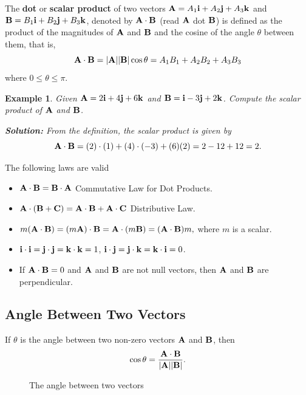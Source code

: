 \documentclass[titlepage,a4paper,12pt]{report}
\newtheorem{example}{Example}[section]
\begin{document}
\noindent The \textbf{dot} or \textbf{scalar product} of two vectors ${\bf{A}}=A_1{\bf{i}}+A_2{\bf{j}}+A_3{\bf{k}}$ and ${\bf{B}}=B_1{\bf{i}}+B_2{\bf{j}}+{B_3\bf{k}}$, denoted by ${\bf{A\cdot B}}$ (read ${\bf{A}}$ dot ${\bf{B}}$) is defined as the product of the magnitudes of ${\bf{A}}$ and ${\bf{B}}$ and the cosine of the angle $\theta$ between them, that is, 
\[{\bf{A \cdot B}}=|{\bf{A}}||{\bf{B}}|\cos \theta =A_1B_1+A_2B_2+A_3B_3\] where $0\leq \theta \leq \pi$.
\begin{example}
Given ${\bf{A}}=2{\bf{i}}+4{\bf{j}}+6{\bf{k}}$ and ${\bf{B}}={\bf{i}}-3{\bf{j}}+2{\bf{k}}$. Compute the scalar product of ${\bf{A}}$ and ${\bf{B}}$. 

\noindent \textbf{Solution:} From the definition, the scalar product is given by 
\[{\bf{A\cdot B}}=(2)\cdot (1)+(4)\cdot (-3)+(6)(2)=2-12+12=2.\]
\end{example}
\noindent The following laws are valid
\begin{itemize}
\item[(i)] ${\bf{A\cdot B}}={\bf{B\cdot A}}$ \quad \quad Commutative Law for Dot Products. 
\item[(ii)] ${\bf{A}\cdot (\bf{B}+\bf{C})}={\bf{A\cdot B}} +{\bf{A\cdot C}}$ \quad Distributive Law.
\item[(iii)] $m({\bf{A\cdot B}})=(m{\bf{A}})\cdot {\bf{B}}={\bf{A}}\cdot (m{\bf{B}})=({\bf{A\cdot B}})m,$ where $m$ is a scalar.
\item[(iv)] ${\bf{i}\cdot \bf{i}}={\bf{j}\cdot \bf{j}}={\bf{k}\cdot \bf{k}}=1$, ${\bf{i}\cdot \bf{j}}={\bf{j}\cdot \bf{k}}={\bf{k}\cdot \bf{i}}=0$.
\item[(v)] If ${\bf{A\cdot B}}=0$ and ${\bf{A}}$ and ${\bf{B}}$ are not null vectors, then ${\bf{A}}$ and ${\bf{B}}$ are perpendicular. 
\end{itemize}
\subsection{Angle Between Two Vectors}
If $\theta$ is the angle between two non-zero vectors ${\bf{A}}$ and ${\bf{B}}$, then 
\[\cos \theta =\dfrac{{\bf{A\cdot \bf{B}}}}{|{\bf{A}}||{\bf{B}}|}.\]
\begin{figure}[h!]

\caption{The angle between two vectors}
\end{figure}
\end{document}
